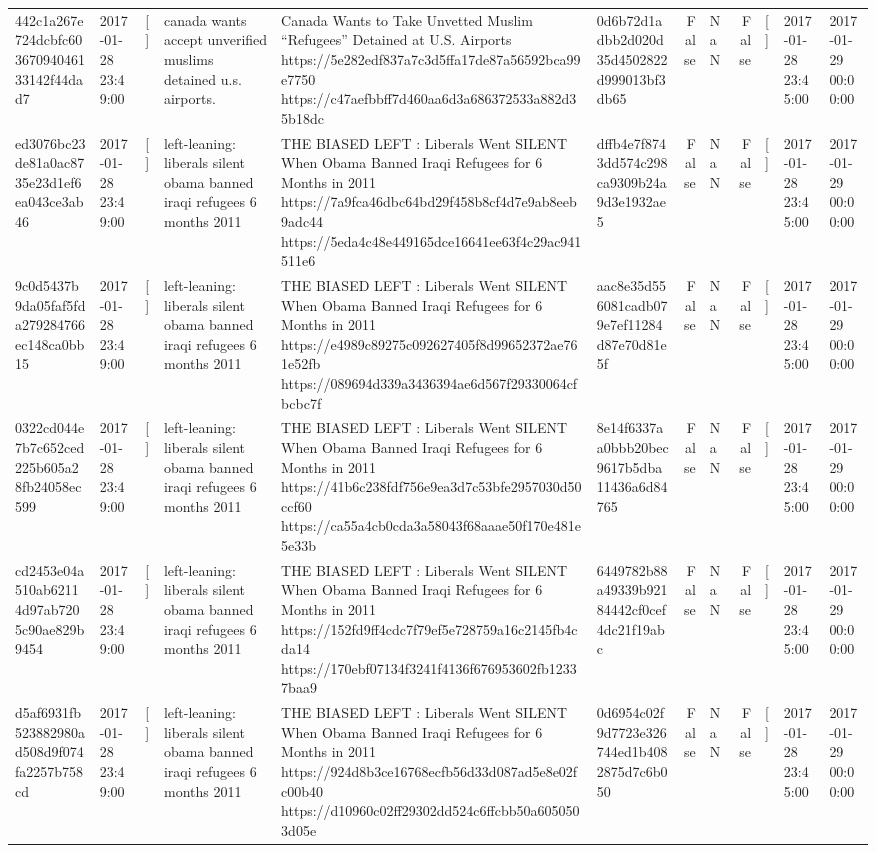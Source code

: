 \begin{tabular}{llllllrlrlll}
442c1a267e724dcbfc60367094046133142f44dad7 & 2017-01-28 23:49:00 & [] & canada wants accept unverified muslims detained u.s. airports. & Canada Wants to Take Unvetted Muslim “Refugees” Detained at U.S. Airports https://5e282edf837a7c3d5ffa17de87a56592bca99e7750 https://c47aefbbff7d460aa6d3a686372533a882d35b18dc & 0d6b72d1adbb2d020d35d4502822d999013bf3db65 & False & NaN & False & [] & 2017-01-28 23:45:00 & 2017-01-29 00:00:00 \\
ed3076bc23de81a0ac8735e23d1ef6ea043ce3ab46 & 2017-01-28 23:49:00 & [] & left-leaning: liberals silent obama banned iraqi refugees 6 months 2011 & THE BIASED LEFT : Liberals Went SILENT When Obama Banned Iraqi Refugees for 6 Months in 2011 https://7a9fca46dbc64bd29f458b8cf4d7e9ab8eeb9adc44 https://5eda4c48e449165dce16641ee63f4c29ac941511e6 & dffb4e7f8743dd574c298ca9309b24a9d3e1932ae5 & False & NaN & False & [] & 2017-01-28 23:45:00 & 2017-01-29 00:00:00 \\
9c0d5437b9da05faf5fda279284766ec148ca0bb15 & 2017-01-28 23:49:00 & [] & left-leaning: liberals silent obama banned iraqi refugees 6 months 2011 & THE BIASED LEFT : Liberals Went SILENT When Obama Banned Iraqi Refugees for 6 Months in 2011 https://e4989c89275c092627405f8d99652372ae761e52fb https://089694d339a3436394ae6d567f29330064cfbcbc7f & aac8e35d556081cadb079e7ef11284d87e70d81e5f & False & NaN & False & [] & 2017-01-28 23:45:00 & 2017-01-29 00:00:00 \\
0322cd044e7b7c652ced225b605a28fb24058ec599 & 2017-01-28 23:49:00 & [] & left-leaning: liberals silent obama banned iraqi refugees 6 months 2011 & THE BIASED LEFT : Liberals Went SILENT When Obama Banned Iraqi Refugees for 6 Months in 2011 https://41b6c238fdf756e9ea3d7c53bfe2957030d50ccf60 https://ca55a4cb0cda3a58043f68aaae50f170e481e5e33b & 8e14f6337aa0bbb20bec9617b5dba11436a6d84765 & False & NaN & False & [] & 2017-01-28 23:45:00 & 2017-01-29 00:00:00 \\
cd2453e04a510ab62114d97ab7205c90ae829b9454 & 2017-01-28 23:49:00 & [] & left-leaning: liberals silent obama banned iraqi refugees 6 months 2011 & THE BIASED LEFT : Liberals Went SILENT When Obama Banned Iraqi Refugees for 6 Months in 2011 https://152fd9ff4cdc7f79ef5e728759a16c2145fb4cda14 https://170ebf07134f3241f4136f676953602fb12337baa9 & 6449782b88a49339b92184442cf0cef4dc21f19abc & False & NaN & False & [] & 2017-01-28 23:45:00 & 2017-01-29 00:00:00 \\
d5af6931fb523882980ad508d9f074fa2257b758cd & 2017-01-28 23:49:00 & [] & left-leaning: liberals silent obama banned iraqi refugees 6 months 2011 & THE BIASED LEFT : Liberals Went SILENT When Obama Banned Iraqi Refugees for 6 Months in 2011 https://924d8b3ce16768ecfb56d33d087ad5e8e02fc00b40 https://d10960c02ff29302dd524c6ffcbb50a6050503d05e & 0d6954c02f9d7723e326744ed1b4082875d7c6b050 & False & NaN & False & [] & 2017-01-28 23:45:00 & 2017-01-29 00:00:00 \\

\end{tabular}
